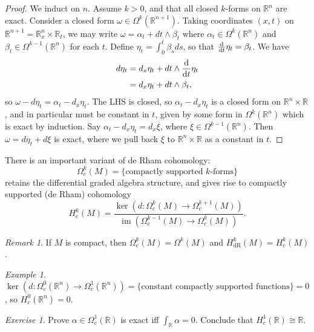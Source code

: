 \documentclass[a4paper]{article}
\theoremstyle{definition}
\theoremstyle{remark}
\newtheorem*{example}{Example}
\newtheorem*{remark}{Remark}
\newtheorem*{exercise}{Exercise}
\DeclareMathOperator{\im}{im}
\newcommand{\dR}{\text{dR}}
\newcommand{\R}{\mathbb{R}}
\begin{document}
\begin{proof}
    We induct on $n$. Assume $k>0$, and that all closed $k$-forms on $\R^n$ are
    exact. Consider a closed form $\omega\in\Omega^k(\R^{n+1})$. Taking
    coordinates $(x,t)$ on $\R^{n+1}=\R^n_x\times\R_t$, we may write
    $\omega=\alpha_t+dt\wedge\beta_t$ where $\alpha_t\in\Omega^k(\R^n)$ and
    $\beta_t\in\Omega^{k-1}(\R^n)$ for each $t$. Define
    $\eta_t=\int_0^t\beta_sds$, so that $\odv{}{t}\eta_t=\beta_t$. We have
    \begin{align*}
        d\eta_t
            &= d_x\eta_t + dt\wedge\odv{}{t}\eta_t \\
            &= d_x\eta_t + dt\wedge\beta_t,
    \end{align*}
    so $\omega-d\eta_t=\alpha_t-d_x\eta_t$. The LHS is closed, so
    $\alpha_t-d_x\eta_t$ is a closed form on $\R^n\times\R$, and in particular
    must be constant in $t$, given by some form in $\Omega^k(\R^n)$ which is
    exact by induction. Say $\alpha_t-d_x\eta_t=d_x\xi$, where
    $\xi\in\Omega^{k-1}(\R^n)$. Then $\omega=d\eta_t+d\xi$ is exact, where we
    pull back $\xi$ to $\R^n\times\R$ as a constant in $t$.
\end{proof}

There is an important variant of de Rham cohomology:
\begin{equation*}
    \Omega^k_c(M) = \{\text{compactly supported $k$-forms}\}
\end{equation*}
retains the differential graded algebra structure, and gives rise to compactly
supported (de Rham) cohomology
\begin{equation*}
    H^k_c(M) = \frac{\ker(d:\Omega^k_c(M)\to\Omega^{k+1}_c(M))}
        {\im(\Omega^{k-1}_c(M)\to\Omega^k_c(M))}.
\end{equation*}

\begin{remark}
    If $M$ is compact, then $\Omega^k_c(M)=\Omega^k(M)$ and
    $H^k_\dR(M)=H^k_c(M)$.
\end{remark}

\begin{example}
    $\ker(d:\Omega^0_c(\R^n)\to\Omega^1_c(\R^n))
    =\{\text{constant compactly supported functions}\}=0$, so $H^0_c(\R^n)=0$.
\end{example}

\begin{exercise}
    Prove $\alpha\in\Omega^1_c(\R)$ is exact iff $\int_\R\alpha=0$. Conclude
    that $H^1_c(\R)\cong\R$.
\end{exercise}
\end{document}
